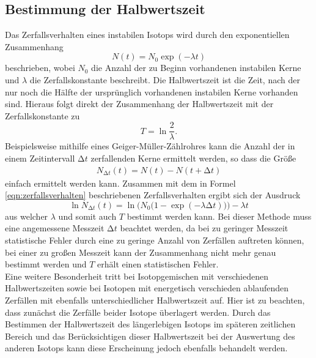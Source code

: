 \subsection{Bestimmung der Halbwertszeit}
Das Zerfallsverhalten eines instabilen Isotops wird durch den exponentiellen Zusammenhang
\begin{equation}
  N(t) = N_0 \exp{(-\lambda t)}
  \label{eqn:zerfallsverhalten}
\end{equation}
beschrieben, wobei $N_0$ die Anzahl der zu Beginn vorhandenen instabilen Kerne und $\lambda$ die Zerfallskonstante beschreibt.
Die Halbwertszeit ist die Zeit, nach der nur noch die Hälfte der ursprünglich vorhandenen instabilen Kerne vorhanden sind.
Hieraus folgt direkt der Zusammenhang der Halbwertszeit mit der Zerfallskonstante zu
\begin{equation}
  T = \ln{\frac{2}{\lambda}}.
  \label{eqn:halbwertszeit}
\end{equation}
Beispielsweise mithilfe eines Geiger-Müller-Zählrohres kann die Anzahl der in einem Zeitintervall $\increment t$ zerfallenden Kerne ermittelt werden, so dass die Größe
\begin{align*}
  N_{\increment t}(t) = N(t) - N(t + \increment t)
\end{align*}
einfach ermittelt werden kann.
Zusammen mit dem in Formel \eqref{eqn:zerfallsverhalten} beschriebenen Zerfallsverhalten ergibt sich der Ausdruck
\begin{equation}
  \ln{ N_{\increment t}}(t) = \ln{\bigl( N_0 (1- \exp{(-\lambda \increment t)}} )\bigr) - \lambda t
  \label{eqn:totalwichtigeformel}
\end{equation}
aus welcher $\lambda$ und somit auch $T$ bestimmt werden kann.
Bei dieser Methode muss eine angemessene Messzeit $\increment t$ beachtet werden, da bei zu geringer Messzeit statistische Fehler durch eine zu geringe Anzahl von Zerfällen auftreten können, bei einer zu großen Messzeit kann der Zusammenhang nicht mehr genau bestimmt werden und $T$ erhält einen statistischen Fehler.\\
Eine weitere Besonderheit tritt bei Isotopgemischen mit verschiedenen Halbwertszeiten sowie bei Isotopen mit energetisch verschieden ablaufenden Zerfällen mit ebenfalls unterschiedlicher Halbwertszeit auf.
Hier ist zu beachten, dass zunächst die Zerfälle beider Isotope überlagert werden.
Durch das Bestimmen der Halbwertszeit des längerlebigen Isotops im späteren zeitlichen Bereich und das Berücksichtigen dieser Halbwertszeit bei der Auswertung des anderen Isotops kann diese Erscheinung jedoch ebenfalls behandelt werden.


